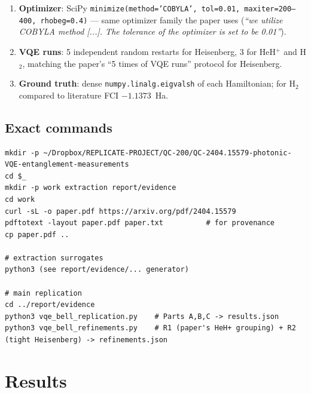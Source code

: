 \documentclass[11pt]{article}
\begin{document}
\begin{enumerate}
\begin{itemize}
      \item \emph{Group estimator (QWC group)}: one tensor-product basis measurement estimates all Paulis in a QWC group simultaneously by re-weighting the counts by each Pauli's parity mask.
      \item \emph{Group estimator (GC group, 2-qubit)}: one Bell-basis measurement estimates $\{XX,YY,ZZ,II\}$ (subset used per group).
    \end{itemize}
  \item \textbf{Optimizer}: SciPy \texttt{minimize(method='COBYLA', tol=0.01, maxiter=200--400, rhobeg=0.4)} --- same optimizer family the paper uses (\emph{``we utilize COBYLA method [...]. The tolerance of the optimizer is set to be 0.01''}).
  \item \textbf{VQE runs}: 5 independent random restarts for Heisenberg, 3 for HeH$^+$ and H$_2$, matching the paper's ``5 times of VQE runs'' protocol for Heisenberg.
  \item \textbf{Ground truth}: dense \texttt{numpy.linalg.eigvalsh} of each Hamiltonian; for H$_2$ compared to literature FCI $-1.1373$~Ha.
\end{enumerate}

\subsection{Exact commands}
\begin{lstlisting}
mkdir -p ~/Dropbox/REPLICATE-PROJECT/QC-200/QC-2404.15579-photonic-VQE-entanglement-measurements
cd $_
mkdir -p work extraction report/evidence
cd work
curl -sL -o paper.pdf https://arxiv.org/pdf/2404.15579
pdftotext -layout paper.pdf paper.txt          # for provenance
cp paper.pdf ..

# extraction surrogates
python3 (see report/evidence/... generator)

# main replication
cd ../report/evidence
python3 vqe_bell_replication.py    # Parts A,B,C -> results.json
python3 vqe_bell_refinements.py    # R1 (paper's HeH+ grouping) + R2 (tight Heisenberg) -> refinements.json
\end{lstlisting}

\section{Results}
\end{document}
